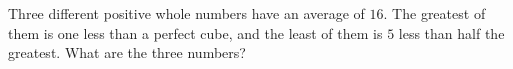 Three different positive whole numbers have an average of $16$. The greatest of them is one less than a perfect cube, and the least of them is $5$ less than half the greatest. What are the three numbers?
